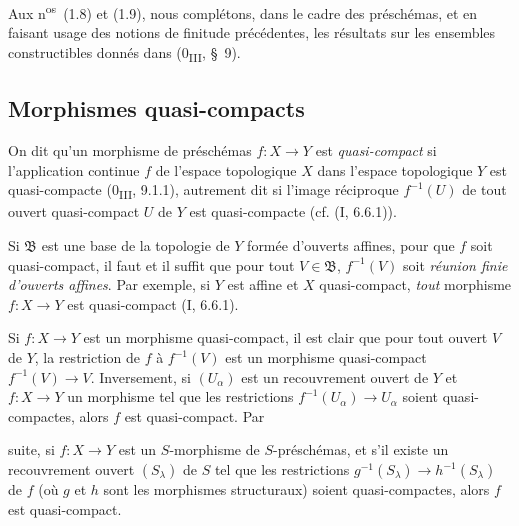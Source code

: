 Aux n\textsuperscript{os}~(1.8) et (1.9), nous complétons, dans le cadre des
préschémas, et en faisant usage des notions de finitude précédentes, les
résultats sur les ensembles constructibles donnés dans
(0\textsubscript{III}, §~9).

\subsection{Morphismes quasi-compacts}
\label{subsection:IV.1.1-fr}

\begin{definition}[1.1.1]
\label{IV.1.1.1-fr}
On dit qu'un morphisme de préschémas $f:X\to Y$ est \emph{quasi-compact} si
l'application continue $f$ de l'espace topologique $X$ dans l'espace
topologique $Y$ est quasi-compacte (0\textsubscript{III}, 9.1.1), autrement
dit si l'image réciproque $f^{-1}(U)$ de tout ouvert quasi-compact $U$ de $Y$
est quasi-compacte (cf. (I, 6.6.1)).
\end{definition}

Si $\mathfrak B$ est une base de la topologie de $Y$ formée d'ouverts
affines, pour que $f$ soit quasi-compact, il faut et il suffit que pour tout
$V\in\mathfrak B$, $f^{-1}(V)$ soit \emph{réunion finie d'ouverts affines}.
Par exemple, si $Y$ est affine et $X$ quasi-compact, \emph{tout} morphisme
$f:X\to Y$ est quasi-compact (I, 6.6.1).

Si $f:X\to Y$ est un morphisme quasi-compact, il est clair que pour tout
ouvert $V$ de $Y$, la restriction de $f$ à $f^{-1}(V)$ est un morphisme
quasi-compact $f^{-1}(V)\to V$. Inversement, si $(U_\alpha)$ est un
recouvrement ouvert de $Y$ et $f:X\to Y$ un morphisme tel que les restrictions
$f^{-1}(U_\alpha)\to U_\alpha$ soient quasi-compactes, alors $f$ est
quasi-compact. Par


suite, si $f:X\to Y$ est un $S$-morphisme de $S$-préschémas, et s'il existe
un recouvrement ouvert $(S_\lambda)$ de $S$ tel que les restrictions
$g^{-1}(S_\lambda)\to h^{-1}(S_\lambda)$ de $f$ (où $g$ et $h$ sont les
morphismes structuraux) soient quasi-compactes, alors $f$ est quasi-compact.

